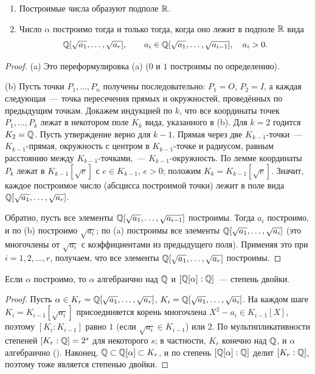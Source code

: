 \begin{theorem}[1.37]
\begin{enumerate}[label=(\alph*)]
\item Построимые числа образуют подполе $\mathbb R$.
\item Число $\alpha$ построимо тогда и только тогда, когда оно лежит в подполе $\mathbb R$ вида
\[
\mathbb Q[\sqrt{a_1},\dots,\sqrt{a_r}],\qquad a_i\in\mathbb Q[\sqrt{a_1},\dots,\sqrt{a_{i-1}}],\quad a_i>0 .
\]
\end{enumerate}
\end{theorem}

\begin{proof}
(a) Это переформулировка (a) ($0$ и $1$ построимы по определению).

(b) Пусть точки $P_1,\dots,P_n$ получены последовательно: $P_1=O$, $P_2=I$, а каждая следующая~--- точка пересечения
прямых и окружностей, проведённых по предыдущим точкам. Докажем индукцией по $k$, что все координаты точек
$P_1,\dots,P_k$ лежат в некотором поле $K_k$ вида, указанного в (b). Для $k=2$ годится $K_2=\mathbb Q$. Пусть утверждение верно
для $k-1$. Прямая через две $K_{k-1}$-точки~--- $K_{k-1}$-прямая, окружность с центром в $K_{k-1}$-точке и радиусом,
равным расстоянию между $K_{k-1}$-точками,~--- $K_{k-1}$-окружность. По лемме  координаты $P_k$ лежат в
$K_{k-1}[\sqrt e]$ с $e\in K_{k-1}$, $e>0$; положим $K_k=K_{k-1}[\sqrt e]$. Значит, каждое построимое число (абсцисса
построимой точки) лежит в поле вида $\mathbb Q[\sqrt{a_1},\dots,\sqrt{a_r}]$.

Обратно, пусть все элементы $\mathbb Q[\sqrt{a_1},\dots,\sqrt{a_{i-1}}]$ построимы. Тогда $a_i$ построимо, и по (b) построимо
$\sqrt{a_i}$; по (a) построимы все элементы $\mathbb Q[\sqrt{a_1},\dots,\sqrt{a_i}]$ (это многочлены от $\sqrt{a_i}$ с коэффициентами
из предыдущего поля). Применяя это при $i=1,2,\dots,r$, получаем, что все элементы $\mathbb Q[\sqrt{a_1},\dots,\sqrt{a_r}]$
построимы.
\end{proof}

\begin{corollary}[1.38]
Если $\alpha$ построимо, то $\alpha$ алгебраично над $\mathbb Q$ и $[\mathbb Q[\alpha]:\mathbb Q]$~--- степень двойки.
\end{corollary}

\begin{proof}
Пусть $\alpha\in K_r=\mathbb Q[\sqrt{a_1},\dots,\sqrt{a_r}]$, $K_i=\mathbb Q[\sqrt{a_1},\dots,\sqrt{a_i}]$. На каждом шаге
$K_i=K_{i-1}[\sqrt{a_i}]$ присоединяется корень многочлена $X^2-a_i\in K_{i-1}[X]$, поэтому $[K_i:K_{i-1}]$ равно $1$ (если
$\sqrt{a_i}\in K_{i-1}$) или $2$. По мультипликативности степеней  $[K_r:\mathbb Q]=2^s$ для некоторого $s$; в частности,
$K_r$ конечно над $\mathbb Q$, и $\alpha$ алгебраично (). Наконец, $\mathbb Q\subset\mathbb Q[\alpha]\subset K_r$, и по  степень
$[\mathbb Q[\alpha]:\mathbb Q]$ делит $[K_r:\mathbb Q]$, поэтому тоже является степенью двойки.
\end{proof}


